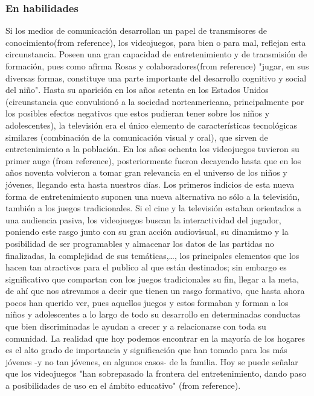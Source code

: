 \documentclass{bmcart}
\begin{document}
\subsubsection*{En habilidades}
Si los medios de comunicación desarrollan un papel de transmisores de conocimiento(from reference\cite{audio}), los videojuegos, para bien o para mal, reflejan esta circunstancia. Poseen una gran capacidad de entretenimiento y de transmisión de formación, pues como afirma Rosas y colaboradores(from reference\cite{Nintendo}) "jugar, en sus diversas formas, constituye una parte importante del desarrollo cognitivo y social del niño".
\newline
\newline
Hasta su aparición en los años setenta en los Estados Unidos (circunstancia que convulsionó a la sociedad norteamericana, principalmente por los posibles efectos negativos que estos pudieran tener sobre los niños y adolescentes), la televisión era el único elemento de características tecnológicas similares (combinación de la comunicación visual y oral), que sirven de entretenimiento a la población. En los años ochenta los videojuegos tuvieron su primer auge (from reference\cite{aoizu}), posteriormente fueron decayendo hasta que en los años noventa volvieron a tomar gran relevancia en el universo de los niños y jóvenes, llegando esta hasta nuestros días.
\newline
\newline
Los primeros indicios de esta nueva forma de entretenimiento suponen una nueva alternativa no sólo a la televisión, también a los juegos tradicionales. Si el cine y la televisión estaban orientados a una audiencia pasiva, los videojuegos buscan la interactividad del jugador, poniendo este rasgo junto con su gran acción audiovisual, su dinamismo y la posibilidad de ser programables y almacenar los datos de las partidas no finalizadas, la complejidad de sus temáticas,…, los principales elementos que los hacen tan atractivos para el publico al que están destinados; sin embargo es significativo que compartan con los juegos tradicionales su fin, llegar a la meta, de ahí que nos atrevamos a decir que tienen un rasgo formativo, que hasta ahora pocos han querido ver, pues aquellos juegos y estos formaban y forman a los niños y adolescentes a lo largo de todo su desarrollo en determinadas conductas que bien discriminadas le ayudan a crecer y a relacionarse con toda su comunidad.
\newline
\newline
La realidad que hoy podemos encontrar en la mayoría de los hogares es el alto grado de importancia y significación que han tomado para los más jóvenes -y no tan jóvenes, en algunos casos- de la familia. Hoy se puede señalar que los videojuegos "han sobrepasado la frontera del entretenimiento, dando paso a posibilidades de uso en el ámbito educativo" (from reference\cite{GRECTPPR-022840}).
	
\end{document}
